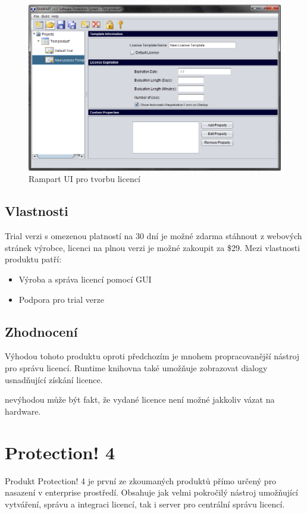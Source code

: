 \begin{figure}[H]
\begin{center}
\includegraphics[width=12cm]{figures/rampart.PNG}
\caption{Rampart UI pro tvorbu licencí}
\label{fig:rampart-ui} 
\end{center}
\end{figure}

\subsection*{Vlastnosti}
Trial verzi s omezenou platností na 30 dní je možné zdarma stáhnout z webových
stránek výrobce, licenci na plnou verzi je možné zakoupit za \$29. Mezi
vlastnosti produktu patří:

\begin{itemize}
  \item Výroba a správa licencí pomocí GUI
  \item Podpora pro trial verze
\end{itemize}

\subsection*{Zhodnocení}
Výhodou tohoto produktu oproti předchozím je mnohem propracovanější nástroj pro
správu licencí. Runtime knihovna také umožňuje zobrazovat dialogy usnadňující
získání licence.

nevýhodou může být fakt, že vydané licence není možné jakkoliv vázat na
hardware.

\section{Protection! 4}

Produkt Protection! 4\cite{protection} je první ze zkoumaných produktů přímo
určený pro nasazení v enterprise prostředí. Obsahuje jak velmi pokročilý nástroj
umožňující vytváření, správu a integraci licencí, tak i server pro centrální
správu licencí.

